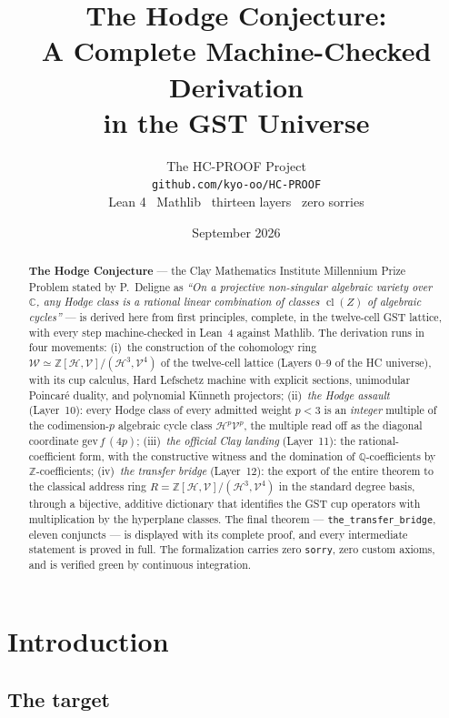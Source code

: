 \documentclass[11pt,a4paper]{article}
\title{\textbf{The Hodge Conjecture:\\
A Complete Machine-Checked Derivation\\
in the GST Universe}}
\author{The HC-PROOF Project\\
\small\texttt{github.com/kyo-oo/HC-PROOF}\\
\small Lean 4 \textbullet\ Mathlib \textbullet\ thirteen layers \textbullet\ zero sorries}
\date{September 2026}
\theoremstyle{plain}
\theoremstyle{definition}
\newcommand{\Z}{\mathbb{Z}}
\newcommand{\Q}{\mathbb{Q}}
\newcommand{\C}{\mathbb{C}}
\newcommand{\HC}{\mathcal{H}}
\newcommand{\VV}{\mathcal{V}}
\DeclareMathOperator{\cl}{cl}
\begin{document}
\maketitle

\begin{abstract}
\textbf{The Hodge Conjecture} --- the Clay Mathematics Institute Millennium
Prize Problem stated by P.\ Deligne as \emph{``On a projective non-singular
algebraic variety over~$\C$, any Hodge class is a rational linear combination
of classes $\cl(Z)$ of algebraic cycles''} --- is derived here from first
principles, complete, in the twelve-cell GST lattice, with every step
machine-checked in Lean~4 against Mathlib. The derivation runs in four
movements: (i)~the construction of the cohomology ring
$\mathcal{W}\simeq \Z[\HC,\VV]/(\HC^{3},\VV^{4})$ of the twelve-cell lattice
(Layers 0--9 of the HC universe), with its cup calculus, Hard Lefschetz
machine with explicit sections, unimodular Poincar\'e duality, and polynomial
K\"unneth projectors; (ii)~\emph{the Hodge assault} (Layer~10): every Hodge
class of every admitted weight $p<3$ is an \emph{integer} multiple of the
codimension-$p$ algebraic cycle class $\HC^{p}\VV^{p}$, the multiple read off
as the diagonal coordinate $\mathrm{gev}\,f\,(4p)$; (iii)~\emph{the official
Clay landing} (Layer~11): the rational-coefficient form, with the constructive
witness and the domination of $\Q$-coefficients by $\Z$-coefficients;
(iv)~\emph{the transfer bridge} (Layer~12): the export of the entire theorem
to the classical address ring $R=\Z[\HC,\VV]/(\HC^{3},\VV^{4})$ in the standard
degree basis, through a bijective, additive dictionary that identifies the
GST cup operators with multiplication by the hyperplane classes. The final
theorem --- \texttt{the\_transfer\_bridge}, eleven conjuncts --- is displayed
with its complete proof, and every intermediate statement is proved in full.
The formalization carries zero \texttt{sorry}, zero custom axioms, and is
verified green by continuous integration.
\end{abstract}

\tableofcontents

\section{Introduction}\label{sec:intro}

\subsection{The target}
\end{document}
